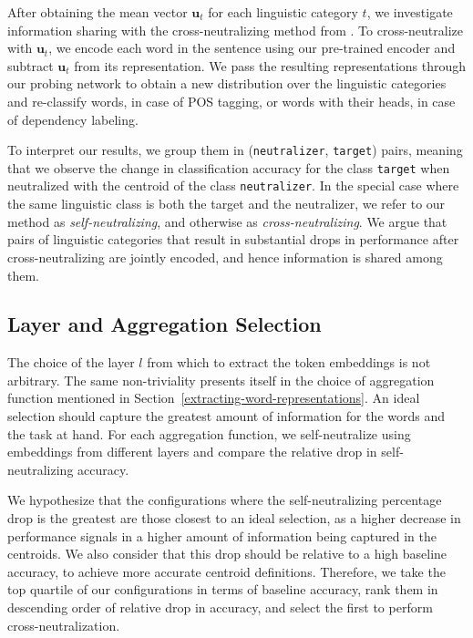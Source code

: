 \documentclass[11pt,a4paper]{article}
\begin{document}
After obtaining the mean vector $\mathbf{u}_{t}$ for each linguistic category $t$, we investigate information sharing with the cross-neutralizing method from \citet{choenni_investigating_2022}. To cross-neutralize with $\mathbf{u}_{t}$, we encode each word in the sentence using our pre-trained encoder and subtract $\mathbf{u}_t$ from its representation. We pass the resulting representations through our probing network to obtain a new distribution over the linguistic categories and re-classify words, in case of POS tagging, or words with their heads, in case of dependency labeling.

To interpret our results, we group them in (\texttt{neutralizer}, \texttt{target}) pairs, meaning that we observe the change in classification accuracy for the class \texttt{target} when neutralized with the centroid of the class \texttt{neutralizer}. In the special case where the same linguistic class is both the target and the neutralizer, we refer to our method as \textit{self-neutralizing}, and otherwise as \textit{cross-neutralizing}. We argue that pairs of linguistic categories that result in substantial drops in performance after cross-neutralizing are jointly encoded, and hence information is shared among them.

\subsection{Layer and Aggregation Selection}
\label{sec:layer-agg-selection}
The choice of the layer $l$ from which to extract the token embeddings is not arbitrary. The same non-triviality presents itself in the choice of aggregation function mentioned in Section~\ref{extracting-word-representations}. An ideal selection should capture the greatest amount of information for the words and the task at hand. For each aggregation function, we self-neutralize using embeddings from different layers and compare the relative drop in self-neutralizing accuracy.

We hypothesize that the configurations where the self-neutralizing percentage drop is the greatest are those closest to an ideal selection, as a higher decrease in performance signals in a higher amount of information being captured in the centroids. We also consider that this drop should be relative to a high baseline accuracy, to achieve more accurate centroid definitions. Therefore, we take the top quartile of our configurations in terms of baseline accuracy, rank them in descending order of relative drop in accuracy, and select the first to perform cross-neutralization.
\end{document}
